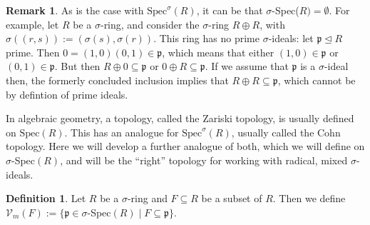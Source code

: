 \documentclass{article}
\def\I{\mathbb{I}}
\def\Vm{\mathcal{V}_m}
\def\p{\mathfrak{p}}
\def\s{\sigma}
\def\Spec{\text{Spec}}
\theoremstyle{definition}
\newtheorem{rem}[Satz]{Remark}
\newtheorem{defn}[Satz]{Definition}
\begin{document}
\begin{rem}
As is the case with $\Spec^\s(R)$, it can be that $\s$-Spec($R)= \emptyset$. For example, let $R$ be a $\s$-ring, and consider the $\s$-ring $R \oplus R$, with $\s( (r,s)):= (\s(s),\s(r))$. This ring has no prime $\s$-ideals:
let $\p \unlhd R$ prime. Then $0 = (1,0)(0,1) \in \p$, which means that either $(1,0) \in \p$ or $(0,1) \in \p$. But then $R \oplus 0 \subseteq \p$ or $0 \oplus R \subseteq \p$. If we assume that $\p$ is a $\s$-ideal then,
the formerly concluded inclusion implies that $R \oplus R \subseteq \p$, which cannot be by defintion of prime ideals.
\end{rem}

In algebraic geometry, a topology, called the Zariski topology, is usually defined on $\Spec(R)$. This has an analogue for $\Spec^\s(R)$, usually called the Cohn topology. Here we will develop a further analogue of both,
 which we will define on $\s$-Spec$(R)$, and will be the ``right'' topology for working with radical, mixed $\s$-ideals.

\begin{defn}
Let $R$ be a $\s$-ring and $F \subseteq R$ be a subset of $R$. Then we define $\Vm (F):= \{ \p \in \s$-Spec$(R) \mid F \subseteq \p \}$. 
\end{defn}
\end{document}
